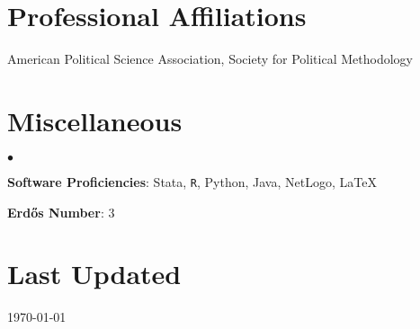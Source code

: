 \documentclass[margin,line]{res}
\newenvironment{list2}{
  \begin{list}{$\bullet$}{%
      \setlength{\itemsep}{0in}
      \setlength{\parsep}{0in} \setlength{\parskip}{0in}
      \setlength{\topsep}{0in} \setlength{\partopsep}{0in} 
      \setlength{\leftmargin}{0.2in}}}{\end{list}}
\begin{document}
\begin{resume}
\section{\sc Professional Affiliations}
American Political Science Association, Society for Political Methodology





\section{\sc Miscellaneous}
\begin{list2}
	\item \textbf{Software Proficiencies}: Stata, {\tt R}, Python, Java, NetLogo, \LaTeX
	\item \textbf{Erd{\H o}s Number}: 3
\end{list2}


\section{\sc Last Updated}
\today

%

\end{resume}
\end{document}
